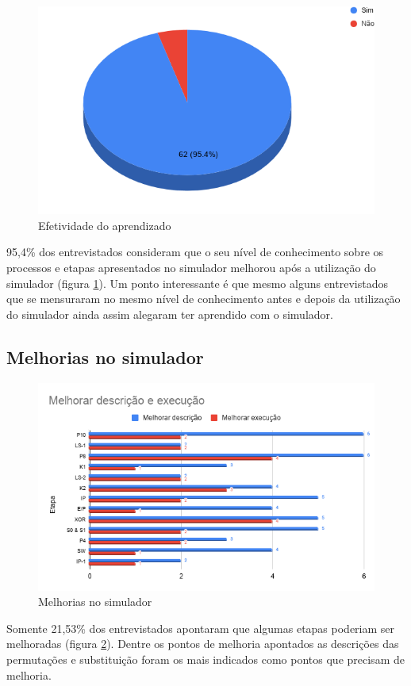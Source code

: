 \begin{figure}[H]
    \centering
    \caption{Efetividade do aprendizado}
    \label{fig:efetividadeaprendizadoresp}
    \includegraphics[width=.65\linewidth]{Questionario/CQ4.png}
\end{figure}

95,4\% dos entrevistados consideram que o seu nível de conhecimento sobre os processos e etapas apresentados no simulador melhorou após a utilização do simulador (figura \ref{fig:efetividadeaprendizadoresp}). Um ponto interessante é que mesmo alguns entrevistados que se mensuraram no mesmo nível de conhecimento antes e depois da utilização do simulador ainda assim alegaram ter aprendido com o simulador.

\subsection{Melhorias no simulador}

\begin{figure}[H]
    \centering
    \caption{Melhorias no simulador}
    \label{fig:melhoriasresp}
    \includegraphics[width=.9\linewidth]{Questionario/CQ5Q6.png}
\end{figure}

Somente 21,53\% dos entrevistados apontaram que algumas etapas poderiam ser melhoradas (figura \ref{fig:melhoriasresp}). Dentre os pontos de melhoria apontados as descrições das permutações e substituição foram os mais indicados como pontos que precisam de melhoria.
